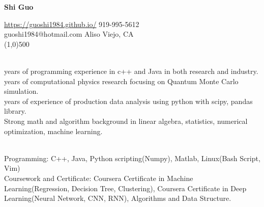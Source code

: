 \documentclass[11pt]{article} %
\begin{document}
 \centerline{\Large \bf Shi Guo}
  \noindent \url{https://guoshi1984.github.io/} \hspace{80mm}  919-995-5612\\
    guoshi1984@hotmail.com \hspace{95mm}   Aliso Viejo, CA\\
\line(1,0){500}


\vspace{1mm}

\\
 years of programming experience in c++ and Java in both research and industry.  \\
 years of computational physics research focusing on Quantum Monte Carlo simulation. \\ 
 years of experience of production data analysis using python with scipy, pandas library.  \\
\noindent Strong math and algorithm background in linear algebra, statistics, numerical optimization, machine learning.\\ 

\vspace{1mm}

\\
\noindent 
Programming: C++, Java, Python scripting(Numpy), Matlab,  Linux(Bash Script, Vim)\\%
Coursework and Certificate: Coursera Certificate in Machine Learning(Regression, Decision Tree, Clustering), Coursera Certificate in Deep Learning(Neural Network, CNN, RNN), Algorithms and Data Structure. 



\vspace{3mm}
\end{document}

